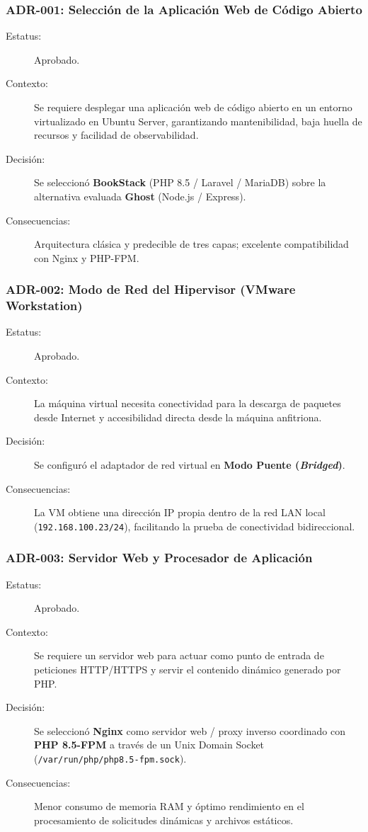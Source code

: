\documentclass[12pt,a4paper]{article}
\begin{document}
\subsubsection{ADR-001: Selección de la Aplicación Web de Código Abierto}
\begin{description}
    \item[Estatus:] Aprobado.
    \item[Contexto:] Se requiere desplegar una aplicación web de código abierto en un entorno virtualizado en Ubuntu Server, garantizando mantenibilidad, baja huella de recursos y facilidad de observabilidad.
    \item[Decisión:] Se seleccionó \textbf{BookStack} (PHP 8.5 / Laravel / MariaDB) sobre la alternativa evaluada \textbf{Ghost} (Node.js / Express).
    \item[Consecuencias:] Arquitectura clásica y predecible de tres capas; excelente compatibilidad con Nginx y PHP-FPM.
\end{description}

\subsubsection{ADR-002: Modo de Red del Hipervisor (VMware Workstation)}
\begin{description}
    \item[Estatus:] Aprobado.
    \item[Contexto:] La máquina virtual necesita conectividad para la descarga de paquetes desde Internet y accesibilidad directa desde la máquina anfitriona.
    \item[Decisión:] Se configuró el adaptador de red virtual en \textbf{Modo Puente (\textit{Bridged})}.
    \item[Consecuencias:] La VM obtiene una dirección IP propia dentro de la red LAN local (\texttt{192.168.100.23/24}), facilitando la prueba de conectividad bidireccional.
\end{description}

\subsubsection{ADR-003: Servidor Web y Procesador de Aplicación}
\begin{description}
    \item[Estatus:] Aprobado.
    \item[Contexto:] Se requiere un servidor web para actuar como punto de entrada de peticiones HTTP/HTTPS y servir el contenido dinámico generado por PHP.
    \item[Decisión:] Se seleccionó \textbf{Nginx} como servidor web / proxy inverso coordinado con \textbf{PHP 8.5-FPM} a través de un Unix Domain Socket (\texttt{/var/run/php/php8.5-fpm.sock}).
    \item[Consecuencias:] Menor consumo de memoria RAM y óptimo rendimiento en el procesamiento de solicitudes dinámicas y archivos estáticos.
\end{description}
\end{document}
